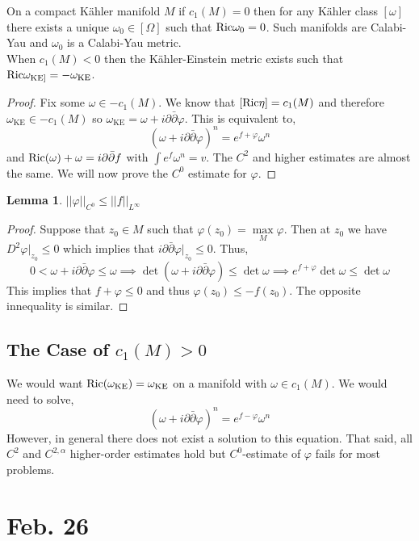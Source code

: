 \documentclass[12pt]{extarticle}
\theoremstyle{definition}
\newtheorem{lemma}[theorem]{Lemma}
\begin{document}
On a compact K\"{a}hler manifold $M$ if $c_1(M) =0$ then for any K\"{a}hler class $[\omega]$ there exists a unique $\omega_0 \in [\Omega]$ such that $\mathrm{Ric}{\omega_0} = 0$. Such manifolds are Calabi-Yau and $\omega_0$ is a Calabi-Yau metric. 
\bigskip\\
When $c_1(M) < 0$ then the K\"{a}hler-Einstein metric exists such that $\mathrm{Ric}{\omega_{\text{KE}]}} = - \omega_{\text{KE}}$. 
\begin{proof}
Fix some $\omega \in - c_1(M)$. We know that $[\mathrm{Ric}{\eta}] = c_1(M)$ and therefore $\omega_{\text{KE}} \in - c_1(M)$ so $\omega_{\text{KE}} = \omega + i \partial \bar{\partial} \varphi$. This is equivalent to,
\[ (\omega + i \partial \bar{\partial} \varphi)^n = e^{f + \varphi} \omega^n \]
and $\mathrm{Ric}{(\omega)} + \omega = i \partial \bar{\partial} f$ with $\int e^f \omega^n = v$. The $C^2$ and higher estimates are almost the same. We will now prove the $C^0$ estimate for $\varphi$.
\end{proof}

\begin{lemma}
$||\varphi||_{C^0} \le || f ||_{L^\infty}$
\end{lemma}

\begin{proof}
Suppose that $z_0 \in M$ such that $\varphi(z_0) = \max\limits_M \varphi$. Then at $z_0$ we have $D^2 \varphi \bigg|_{z_0} \le 0$ which implies that $i \partial \bar{\partial} \varphi \bigg|_{z_0} \le 0$. Thus,
\[ 0 < \omega + i \partial \bar{\partial} \varphi \le \omega \implies \det{(\omega + i \partial \bar{\partial} \varphi)} \le \det{\omega} \implies e^{f + \varphi} \det{\omega} \le \det{\omega} \]
This implies that $f + \varphi \le 0$ and thus $\varphi(z_0) \le - f(z_0)$. The opposite innequality is similar.
\end{proof}

\subsection{The Case of $c_1(M) > 0$}

We would want $\mathrm{Ric}{(\omega_{\text{KE}})} = \omega_{\text{KE}}$ on a manifold with $\omega \in c_1(M)$. We would need to solve,
\[ (\omega + i \partial \bar{\partial} \varphi)^n = e^{f - \varphi} \omega^n \]
However, in general there does not exist a solution to this equation. That said, all $C^2$ and $C^{2, \alpha}$ higher-order estimates hold but $C^0$-estimate of $\varphi$ fails for most problems.  

\section{Feb. 26}
\end{document}
